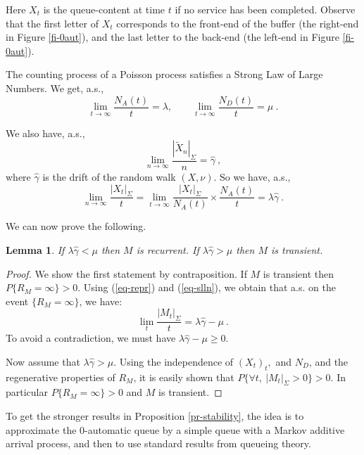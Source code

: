 \documentclass[11pt,a4paper]{article}
\newtheorem{lemma}[theorem]{Lemma}
\theoremstyle{remark}
\def\eref#1{(\ref{#1})}
\begin{document}
Here $X_t$ is the queue-content at time $t$ if no service has
been completed. Observe that the first letter of $X_t$
corresponds to the front-end of the buffer (the right-end in Figure
\ref{fi-0aut}), and the last letter to the back-end (the left-end in Figure
\ref{fi-0aut}).

\medskip

The counting process of a Poisson process satisfies a Strong Law
of Large Numbers. We get, a.s.,
\begin{equation}\label{eq-slln}
\lim_{t\rightarrow \infty} \frac{N_A(t)}{t} = \lambda, \qquad
\lim_{t\rightarrow \infty} \frac{N_D(t)}{t} = \mu \:.
\end{equation}

We also have, a.s.,
\begin{equation*}
\lim_{n\rightarrow \infty} \frac{|\widetilde{X}_n |_{\Sigma}}{n} =
\widehat{\gamma} \:,
\end{equation*}
where $\widehat{\gamma}$ is the drift of the random walk
$(X,\nu)$. So we have, a.s.,
\begin{equation}
\lim_{n\rightarrow \infty}  \frac{|X_t|_{\Sigma}}{t} =
\lim_{t\rightarrow \infty} \frac{|X_t|_{\Sigma}}{N_A(t)} \times
\frac{N_A(t)}{t}= \lambda\widehat{\gamma} \:.
\end{equation}



We can now prove the following.

\begin{lemma}\label{le-step0}
If $\lambda\widehat{\gamma} < \mu$ then $M$ is recurrent. If $\lambda
\widehat{\gamma} > \mu$ then $M$ is transient.
\end{lemma}

\begin{proof}
We show the first statement by contraposition. If $M$ is transient
then $P\{R_M=\infty\}>0$. Using \eref{eq-repr} and \eref{eq-slln},
we obtain that a.s. on the event $\{R_M=\infty\}$, we have:
\[
\lim_t \frac{|M_t|_{\Sigma}}{t} = \lambda \widehat{\gamma} - \mu \:.
\]
To avoid a contradiction, we must have  $\lambda \widehat{\gamma} -
\mu \geq 0$.

Now assume that $\lambda \widehat{\gamma} > \mu$. Using the
independence of $(X_t)_t,$ and $N_D$, and the regenerative properties of $R_M$, it is
easily shown that
$P\{ \forall t, \ |M_t|_{\Sigma} > 0\} >0$. In particular
$P\{R_M=\infty\}>0$ and $M$ is transient.
\end{proof}

To get the stronger results in Proposition \ref{pr-stability}, the
idea is to approximate the 0-automatic queue by a simple queue with a
Markov additive arrival process, and then to use standard results
from queueing theory.
\end{document}
